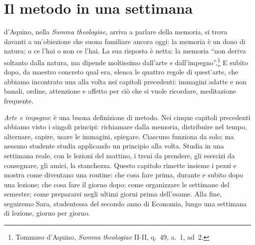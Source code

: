 %
\chapter{Il metodo in una settimana}
\label{cap:metodo}


 d'Aquino, nella \emph{Summa theologiae},
arriva a parlare della memoria, si trova davanti a un'obiezione che
suona familiare ancora oggi: la memoria è un dono di natura; o ce l'hai
o non ce l'hai. La sua risposta è netta: la memoria \enquote{non deriva
soltanto dalla natura, ma dipende moltissimo dall'arte e
dall'impegno}.\footnote{Tommaso d'Aquino, \emph{Summa theologiae}
II-II, q.~49, a.~1, ad~2.} E subito dopo, da maestro concreto qual era,
elenca le quattro regole di quest'arte, che abbiamo incontrato una alla
volta nei capitoli precedenti: immagini adatte e non banali, ordine,
attenzione e affetto per ciò che si vuole ricordare, meditazione
frequente.

\emph{Arte e impegno}: è una buona definizione di metodo. Nei cinque
capitoli precedenti abbiamo visto i singoli principi: richiamare dalla
memoria, distribuire nel tempo, alternare, capire, usare le immagini,
spiegare. Ciascuno funziona da solo; ma nessuno studente studia
applicando un principio alla volta. Studia in una settimana reale, con
le lezioni del mattino, i treni da prendere, gli esercizi da consegnare,
gli amici, la stanchezza. Questo capitolo rimette insieme i pezzi e
mostra come diventano una routine: che cosa fare prima, durante e
subito dopo una lezione; che cosa fare il giorno dopo; come organizzare
le settimane del semestre; come prepararsi negli ultimi giorni prima
dell'esame. Alla fine, seguiremo Sara, studentessa del secondo anno di
Economia, lungo una settimana di lezione, giorno per giorno.

